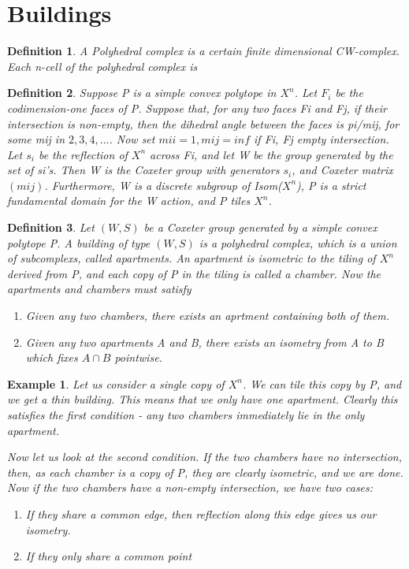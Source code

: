 \documentclass[12pt]{article}
\begin{document}
\newtheorem{definition}{Definition}
\newtheorem{theorem}{Theorem}
\newtheorem{example}{Example}

\section{Buildings}
\begin{definition}
  A Polyhedral complex is a certain finite dimensional CW-complex. Each n-cell of the polyhedral complex is   
\end{definition}

\begin{definition}
    Suppose P is a simple convex polytope in $X^n$. Let $F_i$ be the codimension-one faces of P. Suppose that, for any two faces Fi and Fj, if their intersection is non-empty, then the dihedral angle between the faces is pi/mij, for some mij in ${2,3,4,...}$. Now set $mii=1, mij=inf$ if Fi, Fj empty intersection. Let $s_i$ be the reflection of $X^n$ across Fi, and let W be the group generated by the set of si's. Then W is the Coxeter group with generators $s_i$, and Coxeter matrix $(mij)$. Furthermore, W is a discrete subgroup of Isom($X^n$), P is a strict fundamental domain for the W action, and P tiles $X^n$. 
\end{definition}   
    
\begin{definition}
    Let $(W,S)$ be a Coxeter group generated by a simple convex polytope P. A building of type $(W,S)$ is a polyhedral complex, which is a union of subcomplexs, called apartments. An apartment is isometric to the tiling of $X^n$ derived from P, and each copy of P in the tiling is called a chamber. Now the apartments and chambers must satisfy
    \begin{enumerate}
    \item Given any two chambers, there exists an aprtment containing both of them.
    \item Given any two apartments A and B, there exists an isometry from A to B which fixes $A \cap B$ pointwise. 
    \end{enumerate}
\end{definition}

\begin{example}
    Let us consider a single copy of $X^n$. We can tile this copy by P, and we get a thin building. This means that we only have one apartment. Clearly this satisfies the first condition - any two chambers immediately lie in the only apartment. 

    Now let us look at the second condition. If the two chambers have no intersection, then, as each chamber is a copy of P, they are clearly isometric, and we are done. Now if the two chambers have a non-empty intersection, we have two cases:
    \begin{enumerate}
        \item If they share a common edge, then reflection along this edge gives us our isometry.
        \item If they only share a common point
    \end{enumerate}
\end{example}
\end{document}
